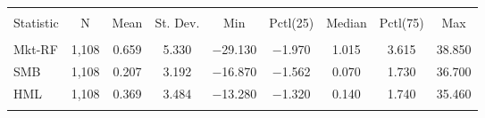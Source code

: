 
\begin{tabular}{@{\extracolsep{5pt}}lcccccccc} 
\\[-1.8ex]\hline 
\hline \\[-1.8ex] 
Statistic & \multicolumn{1}{c}{N} & \multicolumn{1}{c}{Mean} & \multicolumn{1}{c}{St. Dev.} & \multicolumn{1}{c}{Min} & \multicolumn{1}{c}{Pctl(25)} & \multicolumn{1}{c}{Median} & \multicolumn{1}{c}{Pctl(75)} & \multicolumn{1}{c}{Max} \\ 
\hline \\[-1.8ex] 
Mkt-RF & 1,108 & 0.659 & 5.330 & $-$29.130 & $-$1.970 & 1.015 & 3.615 & 38.850 \\ 
SMB & 1,108 & 0.207 & 3.192 & $-$16.870 & $-$1.562 & 0.070 & 1.730 & 36.700 \\ 
HML & 1,108 & 0.369 & 3.484 & $-$13.280 & $-$1.320 & 0.140 & 1.740 & 35.460 \\ 
\hline \\[-1.8ex] 
\end{tabular} 

